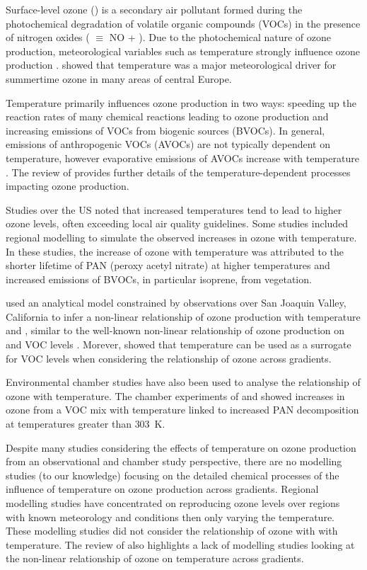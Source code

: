 Surface-level ozone () is a secondary air pollutant formed during the photochemical degradation of volatile organic compounds (VOCs) in the presence of nitrogen oxides ( $\equiv$ NO + ).
Due to the photochemical nature of ozone production, meteorological variables such as temperature strongly influence ozone production \citep{Jacob:2009}.
\citet{Otero:2016} showed that temperature was a major meteorological driver for summertime ozone in many areas of central Europe.

Temperature primarily influences ozone production in two ways: speeding up the reaction rates of many chemical reactions leading to ozone production and increasing emissions of VOCs from biogenic sources (BVOCs).
In general, emissions of anthropogenic VOCs (AVOCs) are not typically dependent on temperature, however evaporative emissions of AVOCs increase with temperature \citep{Rubin:2006}.
The review of \citet{Pusede:2015} provides further details of the temperature-dependent processes impacting ozone production.

Studies over the US \citep{Sillman:1995a, Dawson:2007, Pusede:2014} noted that increased temperatures tend to lead to higher ozone levels, often exceeding local air quality guidelines.
Some studies \citep{Sillman:1995a, Dawson:2007} included regional modelling to simulate the observed increases in ozone with temperature.
In these studies, the increase of ozone with temperature was attributed to the shorter lifetime of PAN (peroxy acetyl nitrate) at higher temperatures and increased emissions of BVOCs, in particular isoprene, from vegetation.

\citet{Pusede:2014} used an analytical model constrained by observations over San Joaquin Valley, California to infer a non-linear relationship of ozone production with temperature and , similar to the well-known non-linear relationship of ozone production on  and VOC levels \citep{Sillman:1999}.
Morever, \citet{Pusede:2014} showed that temperature can be used as a surrogate for VOC levels when considering the relationship of ozone across  gradients.

Environmental chamber studies have also been used to analyse the relationship of ozone with temperature.
The chamber experiments of \citet{Carter:1979} and \citet{Hatakeyama:1991} showed increases in ozone from a VOC mix with temperature linked to increased PAN decomposition at temperatures greater than $303$~K.

Despite many studies considering the effects of temperature on ozone production from an observational and chamber study perspective, there are no modelling studies (to our knowledge) focusing on the detailed chemical processes of the influence of temperature on ozone production across  gradients.
Regional modelling studies have concentrated on reproducing ozone levels over regions with known meteorology and  conditions then only varying the temperature.
These modelling studies did not consider the relationship of ozone with  with temperature.
The review of \citet{Pusede:2015} also highlights a lack of modelling studies looking at the non-linear relationship of ozone on temperature across  gradients.

